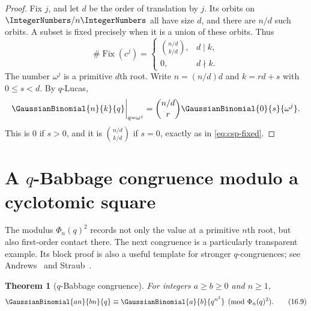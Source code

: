 \documentclass[11pt,a4paper,oneside,openany]{book}
\newtheorem{theorem}{Theorem}[chapter]
\theoremstyle{definition}
\theoremstyle{remark}
\begin{document}
\begin{proof}
Fix $j$, and let $d$ be the order of translation by $j$.  Its orbits on $\IntegerNumbers/n\IntegerNumbers$ all have size $d$, and there are $n/d$ such orbits.  A subset is fixed precisely when it is a union of these orbits.  Thus
\[
 \#\operatorname{Fix}(c^j)
 =\begin{cases}
 \displaystyle\binom{n/d}{k/d},&d\mid k,\\
 0,&d\nmid k.
 \end{cases}
 \tag{16.8}\label{eq:csp-fixed}
\]
The number $\omega^j$ is a primitive $d$th root.  Write $n=(n/d)d$ and $k=rd+s$ with $0\le s<d$.  By $q$-Lucas,
\[
 \GaussianBinomial{n}{k}{q}\bigg|_{q=\omega^j}
 =\binom{n/d}{r}\GaussianBinomial{0}{s}{\omega^j}.
\]
This is $0$ if $s>0$, and it is $\binom{n/d}{k/d}$ if $s=0$, exactly as in \eqref{eq:csp-fixed}.
\end{proof}

\section{A \texorpdfstring{$q$}{q}-Babbage congruence modulo a cyclotomic square}

The modulus $\Phi_n(q)^2$ records not only the value at a primitive $n$th root, but also first-order contact there.  The next congruence is a particularly transparent example.  Its block proof is also a useful template for stronger $q$-congruences; see Andrews~\cite{Andrews1999Congruences} and Straub~\cite{Straub2011Ljunggren}.

\begin{theorem}[$q$-Babbage congruence]\label{thm:q-babbage}
For integers $a\ge b\ge0$ and $n\ge1$,
\[
 \GaussianBinomial{an}{bn}{q}
 \equiv
 \GaussianBinomial{a}{b}{q^{n^2}}
 \pmod{\Phi_n(q)^2}.
 \tag{16.9}\label{eq:q-babbage}
\]
\end{theorem}
\end{document}
